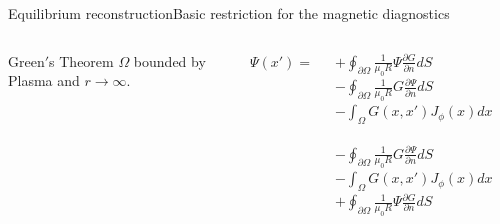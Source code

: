 \documentclass{beamer}
\begin{document}
 \begin{frame}{Equilibrium reconstruction}{Basic restriction for  the magnetic diagnostics }
 \begin{columns}
	\begin{block}{Green$'$s Theorem }
		$\Omega$ bounded by Plasma and $r \to \infty$.
	\end{block}


$\Psi (x') = $

	  { 
			$ + \oint_{\partial \Omega} \frac{1}{\mu_0 R} \Psi  \frac{\partial G }{\partial n}  dS$ \\
			$  - \oint_{\partial \Omega} \frac{1}{\mu_0 R} G \frac{\partial \Psi }{\partial n} dS $
			}
	\only<2>  {   $ - \int_\Omega G(x,x') J_\phi (x) d x$\\
 \\
			$  - \oint_{\partial \Omega} \frac{1}{\mu_0 R} G \frac{\partial \Psi }{\partial n} dS $}
	\only<3>  {   $ - \int_\Omega G(x,x') J_\phi (x) d x$\\
  			$ + \oint_{\partial \Omega} \frac{1}{\mu_0 R} \Psi  \frac{\partial G }{\partial n}  dS$ \\
			}


\end{columns}
\end{frame}
\end{document}
